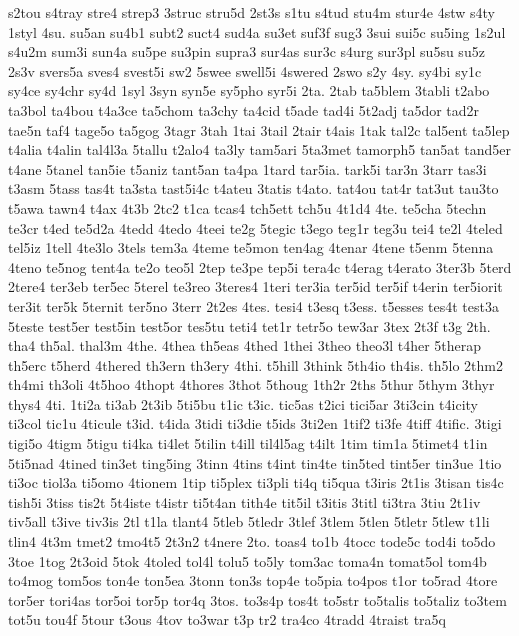 {s2tou
s4tray
stre4
strep3
3struc
stru5d
2st3s
s1tu
s4tud
stu4m
stur4e
4stw
s4ty
1styl
4su.
su5an
su4b1
subt2
suct4
sud4a
su3et
suf3f
sug3
3sui
sui5c
su5ing
1s2ul
s4u2m
sum3i
sun4a
su5pe
su3pin
supra3
sur4as
sur3c
s4urg
sur3pl
su5su
su5z
2s3v
svers5a
sves4
svest5i
sw2
5swee
swell5i
4swered
2swo
s2y
4sy.
sy4bi
sy1c
sy4ce
sy4chr
sy4d
1syl
3syn
syn5e
sy5pho
syr5i
2ta.
2tab
ta5blem
3tabli
t2abo
ta3bol
ta4bou
t4a3ce
ta5chom
ta3chy
ta4cid
t5ade
tad4i
5t2adj
ta5dor
tad2r
tae5n
taf4
tage5o
ta5gog
3tagr
3tah
1tai
3tail
2tair
t4ais
1tak
tal2c
tal5ent
ta5lep
t4alia
t4alin
tal4l3a
5tallu
t2alo4
ta3ly
tam5ari
5ta3met
tamorph5
tan5at
tand5er
t4ane
5tanel
tan5ie
t5aniz
tant5an
ta4pa
1tard
tar5ia.
tark5i
tar3n
3tarr
tas3i
t3asm
5tass
tas4t
ta3sta
tast5i4c
t4ateu
3tatis
t4ato.
tat4ou
tat4r
tat3ut
tau3to
t5awa
tawn4
t4ax
4t3b
2tc2
t1ca
tcas4
tch5ett
tch5u
4t1d4
4te.
te5cha
5techn
te3cr
t4ed
te5d2a
4tedd
4tedo
4teei
te2g
5tegic
t3ego
teg1r
teg3u
tei4
te2l
4teled
tel5iz
1tell
4te3lo
3tels
tem3a
4teme
te5mon
ten4ag
4tenar
4tene
t5enm
5tenna
4teno
te5nog
tent4a
te2o
teo5l
2tep
te3pe
tep5i
tera4c
t4erag
t4erato
3ter3b
5terd
2tere4
ter3eb
ter5ec
5terel
te3reo
3teres4
1teri
ter3ia
ter5id
ter5if
t4erin
ter5iorit
ter3it
ter5k
5ternit
ter5no
3terr
2t2es
4tes.
tesi4
t3esq
t3ess.
t5esses
tes4t
test3a
5teste
test5er
test5in
test5or
tes5tu
teti4
tet1r
tetr5o
tew3ar
3tex
2t3f
t3g
2th.
tha4
th5al.
thal3m
4the.
4thea
th5eas
4thed
1thei
3theo
theo3l
t4her
5therap
th5erc
t5herd
4thered
th3ern
th3ery
4thi.
t5hill
3think
5th4io
th4is.
th5lo
2thm2
th4mi
th3oli
4t5hoo
4thopt
4thores
3thot
5thoug
1th2r
2ths
5thur
5thym
3thyr
thys4
4ti.
1ti2a
ti3ab
2t3ib
5ti5bu
t1ic
t3ic.
tic5as
t2ici
tici5ar
3ti3cin
t4icity
ti3col
tic1u
4ticule
t3id.
t4ida
3tidi
ti3die
t5ids
3ti2en
1tif2
ti3fe
4tiff
4tific.
3tigi
tigi5o
4tigm
5tigu
ti4ka
ti4let
5tilin
t4ill
til4l5ag
t4ilt
1tim
tim1a
5timet4
t1in
5ti5nad
4tined
tin3et
ting5ing
3tinn
4tins
t4int
tin4te
tin5ted
tint5er
tin3ue
1tio
ti3oc
tiol3a
ti5omo
4tionem
1tip
ti5plex
ti3pli
ti4q
ti5qua
t3iris
2t1is
3tisan
tis4c
tish5i
3tiss
tis2t
5t4iste
t4istr
ti5t4an
tith4e
tit5il
t3itis
3titl
ti3tra
3tiu
2t1iv
tiv5all
t3ive
tiv3is
2tl
t1la
tlant4
5tleb
5tledr
3tlef
3tlem
5tlen
5tletr
5tlew
t1li
tlin4
4t3m
tmet2
tmo4t5
2t3n2
t4nere
2to.
toas4
to1b
4tocc
tode5c
tod4i
to5do
3toe
1tog
2t3oid
5tok
4toled
tol4l
tolu5
to5ly
tom3ac
toma4n
tomat5ol
tom4b
to4mog
tom5os
ton4e
ton5ea
3tonn
ton3s
top4e
to5pia
to4pos
t1or
to5rad
4tore
tor5er
tori4as
tor5oi
tor5p
tor4q
3tos.
to3s4p
tos4t
to5str
to5talis
to5taliz
to3tem
tot5u
tou4f
5tour
t3ous
4tov
to3war
t3p
tr2
tra4co
4tradd
4traist
tra5q
}
